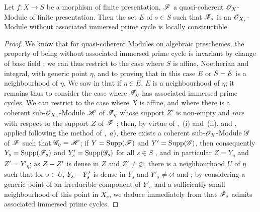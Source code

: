 \begin{proposition}[9.8.1]
\label{IV.9.8.1}
Let $f:X\to S$ be a morphism of finite presentation, $\mathscr{F}$ a quasi-coherent $\mathscr{O}_X$-Module of finite presentation.
Then the set $E$ of $s\in S$ such that $\mathscr{F}_s$ is an $\mathscr{O}_{X_s}$-Module without associated immersed prime cycle is locally constructible.
\end{proposition}

\begin{proof}
\label{IV.9.8.1-proof}
We know that for quasi-coherent Modules on algebraic preschemes, the property of being without associated immersed prime cycle is invariant by change of base field ; we can thus restrict to the case where $S$ is affine, Noetherian and integral, with generic point $\eta$, and to proving that in this case $E$ or $S- E$ is a neighbourhood of $\eta$.
We saw in  that if $\eta\in E$, $E$ is a neighbourhood of $\eta$; it remains thus to consider the case where $\mathscr{F}_\eta$ has associated immersed prime cycles.
We can restrict to the case where $X$ is affine, and where there is a coherent sub-$\mathscr{O}_{X_\eta}$-Module $\mathscr{H}$ of $\mathscr{F}_\eta$ whose support $Z'$ is non-empty and \emph{rare} with respect to the support $Z$ of $\mathscr{F}$ ; then, by virtue of ,~(i) and~(ii),
and , applied following the method of ,~$a$), there exists a coherent sub-$\mathscr{O}_X$-Module $\mathscr{G}$ of $\mathscr{F}$ such that $\mathscr{G}_\eta=\mathscr{H}$; if $Y=\operatorname{Supp}(\mathscr{F})$ and $Y'=\operatorname{Supp}(\mathscr{G})$, then consequently $Y_s=\operatorname{Supp}(\mathscr{F}_s)$ and $Y'_s=\operatorname{Supp}(\mathscr{G}_s)$ for all $s\in S$ , and in particular $Z=Y_\eta$ and $Z'=Y'_\eta$; as $Z- Z'$ is dense in $Z$ and $Z'\neq\varnothing$, there is a neighbourhood $U$ of $\eta$ such that for $s\in U$, $Y_s- Y'_s$ is dense in $Y_s$ and $Y'_s\neq\varnothing$  and ; by considering a generic point of an irreducible component of $Y'_s$ and a sufficiently small neighbourhood of this point in $X_s$, we deduce immediately from  that $\mathscr{F}_s$ admits associated immersed prime cycles.
\end{proof}

